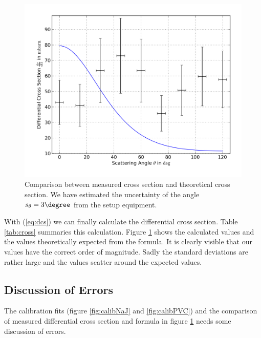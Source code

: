 \begin{figure}[h!]
  \centering
  \includegraphics[width=\textwidth]{plots/cross.png}
  \caption{Comparison between measured cross section and theoretical cross
  section. We have estimated the uncertainty of the angle
  $s_\theta=3\degree$ from the setup equipment.}
  \label{fig:cross}
\end{figure}

With (\ref{eq:dcs}) we can finally calculate the differential cross section.
Table \ref{tab:cross} summaries this calculation. Figure \ref{fig:cross}
shows the
calculated values and the values theoretically expected from the
 formula. It is clearly visible that our values have the
correct order of magnitude. Sadly the standard deviations are rather large and
the values scatter around the expected values.

\subsection{Discussion of Errors}
The calibration fits (figure \ref{fig:calibNaJ} and \ref{fig:calibPVC}) and
the comparison of measured differential cross section and \kleinn formula
in figure \ref{fig:cross} needs some discussion of errors. 

